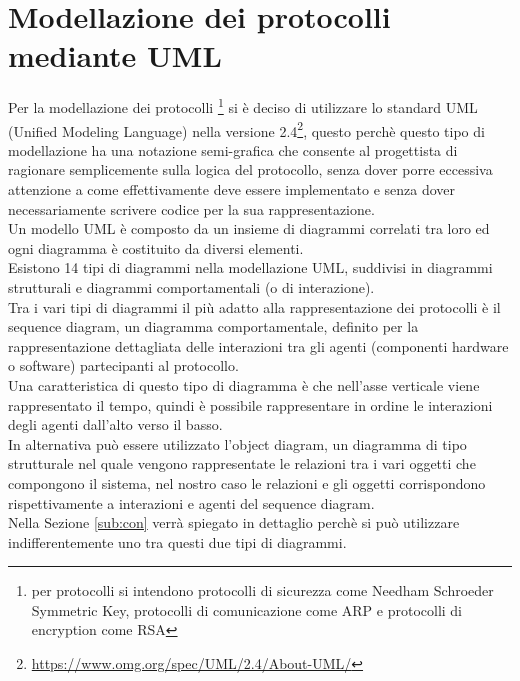 \section{Modellazione dei protocolli mediante UML}

Per la modellazione dei protocolli \footnote{per protocolli si intendono protocolli di sicurezza come Needham Schroeder Symmetric Key, protocolli di comunicazione come ARP e protocolli di encryption come RSA} si è deciso di utilizzare lo standard UML (Unified Modeling Language) nella versione 2.4\footnote{\url{https://www.omg.org/spec/UML/2.4/About-UML/}}, questo perchè questo tipo di modellazione ha una notazione semi-grafica che consente al progettista di ragionare semplicemente sulla logica del protocollo, senza dover porre eccessiva attenzione a come effettivamente deve essere implementato e senza dover necessariamente scrivere codice per la sua rappresentazione.\\  
Un modello UML è composto da un insieme di diagrammi correlati tra loro ed ogni diagramma è costituito da diversi elementi.\\
Esistono 14 tipi di diagrammi nella modellazione UML, suddivisi in diagrammi strutturali e diagrammi comportamentali (o di interazione).\\ 
Tra i vari tipi di diagrammi il più adatto alla rappresentazione dei protocolli è il sequence diagram, un diagramma comportamentale, definito per la rappresentazione dettagliata delle interazioni tra gli agenti (componenti hardware o software) partecipanti al protocollo.\\
Una caratteristica di questo tipo di diagramma è che nell'asse verticale viene rappresentato il tempo, quindi è possibile rappresentare in ordine le interazioni degli agenti dall'alto verso il basso.\\
In alternativa può essere utilizzato l'object diagram, un diagramma di tipo strutturale nel quale vengono rappresentate le relazioni tra i vari oggetti che compongono il sistema, nel nostro caso le relazioni e gli oggetti corrispondono rispettivamente a interazioni e agenti del sequence diagram.\\
Nella Sezione \ref{sub:con} verrà spiegato in dettaglio perchè si può utilizzare indifferentemente uno tra questi due tipi di diagrammi.\\

